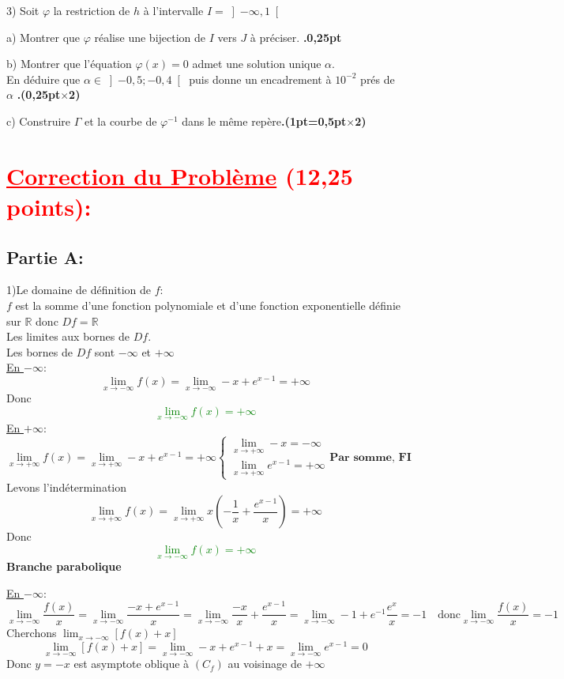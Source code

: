 \documentclass[12pt]{article}
\begin{document}
3) Soit $\varphi$ la restriction de $h$ à l’intervalle $I=\left]-\infty, 1\right[ $
    
    a) Montrer que $\varphi$  réalise une bijection de $I$ vers $J$  à préciser.
    \textbf{.0,25pt}
        
    b) Montrer que l’équation $\varphi(x)=0$ admet une solution unique $\alpha$.\\
    En déduire que $\alpha \in \left]-0,5 ; -0,4 \right[ $ puis donne un encadrement à $10^{-2}$ prés de $\alpha$ \textbf{.(0,25pt$\times$2)}
    
    c) Construire $\Gamma$ et la courbe de $\varphi^{-1}$  dans le même repère\textbf{.(1pt=0,5pt$\times$2)}
\section*{\textcolor{red}{\underline{Correction du Problème} (12,25 points):}}
\subsection*{Partie A:}
1)Le domaine de définition de $f$:\\
$f$ est la somme d'une fonction polynomiale et d'une fonction exponentielle définie sur $\mathbb{R}$ donc $Df=\mathbb{R}$\\
Les limites aux bornes de $Df$.\\
Les bornes de $Df$ sont $-\infty$ et $+\infty$\\
\underline{En $-\infty$}:
\[\lim_{x \to -\infty}f(x)=\lim_{x \to -\infty}-x+e^{x-1}=+\infty\]
Donc \textcolor{green}{\[\lim_{x \to -\infty}f(x)=+\infty\]}
\underline{En $+\infty$}:
\begin{equation*}
\lim_{x \to +\infty}f(x)=\lim_{x \to +\infty}-x+e^{x-1}=+\infty
\begin{cases}
\lim_{x \to +\infty} -x=-\infty\\
\lim_{x \to +\infty}e^{x-1}=+\infty
\end{cases}
\textbf{Par somme, FI}
\end{equation*}
Levons l'indétermination\\
\begin{equation*}
\lim_{x \to +\infty}f(x)=\lim_{x \to +\infty}x\left(-\frac{1}{x}+\frac{e^{x-1}}{x}\right)=+\infty
\end{equation*}
Donc \textcolor{green}{\[\lim_{x \to -\infty}f(x)=+\infty\]}
\textbf{Branche parabolique}
 
\underline{En $-\infty$}:
\begin{equation*}
\lim_{x \to -\infty}\frac{f(x)}{x}=\lim_{x \to -\infty}\frac{-x+e^{x-1}}{x}=\lim_{x \to -\infty}\frac{-x}{x}+\frac{e^{x-1}}{x}=\lim_{x \to -\infty}-1+e^{-1}\frac{e^{x}}{x}=-1
\quad\text{donc} \lim_{x \to -\infty}\frac{f(x)}{x}=-1
\end{equation*}
Cherchons $\lim_{x \to -\infty}\left[ f(x)+x\right] $
\[\lim_{x \to -\infty}\left[ f(x)+x\right]=\lim_{x \to -\infty}-x+e^{x-1}+x=\lim_{x \to -\infty}e^{x-1}=0\]
Donc $y=-x$ est asymptote oblique à $(C_{f})$ au voisinage de $+\infty$
\end{document}

